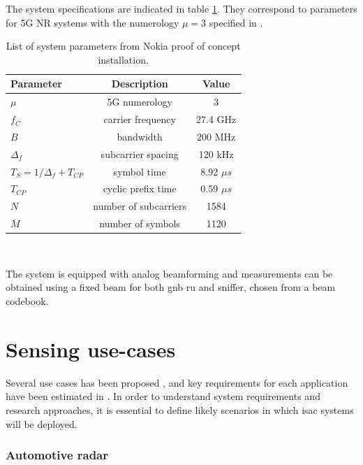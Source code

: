 	
	The system specifications are indicated in table \ref{table:PoCparams}.
	They correspond to parameters for 5G \gls{NR} systems with the numerology $\mu=3$ specified in \cite{TS138211}. 
	
	\begin{table}[H]
		\centering 
		\begin{tabular}{|p{9em} c c |}
			\hline
			\rowcolor{bluepoli!40} %
			\textbf{Parameter} & \textbf{Description} & \textbf{Value}  \T\B \\
			\hline \hline
			$\mu$ & 5G numerology & 3 \T\B \\
			$f_C$ & carrier frequency & 27.4 GHz \T\B \\
			$B$ & bandwidth & 200 MHz \T\B\\
			$\Delta_f$ & subcarrier spacing & 120 kHz  \T\B\\
			$T_S = 1/\Delta_f + T_{CP}$ & symbol time & 8.92 $\mu s$  \T\B\\
			$T_{CP}$ & cyclic prefix time & 0.59 $\mu s$  \T\B\\
			$N$ & number of subcarriers & 1584  \T\B\\
			$M$ & number of symbols & 1120  \B\\
			
			\hline
		\end{tabular}
		\\[10pt]
		\caption{List of system parameters from Nokia proof of concept installation.}
		\label{table:PoCparams}
	\end{table}
	
	The system is equipped with analog beamforming and measurements can be obtained using a fixed beam for both \gls{gnb} \gls{ru} and sniffer, chosen from a beam codebook.


\section{Sensing use-cases}

	Several use cases has been proposed \cite{Mandelli_Henninger_Bauhofer_Wild_2023}, \cite{Wang_Varshney_Gentile_Blandino_Chuang_Golmie_2022} and  key requirements for each application have been estimated in \cite{Wild_Braun_Viswanathan_2021}.
	In order to understand system requirements and research approaches, it is essential to define likely scenarios in which \gls{isac} systems will be deployed.
	
	\subsubsection{Automotive radar}
	
